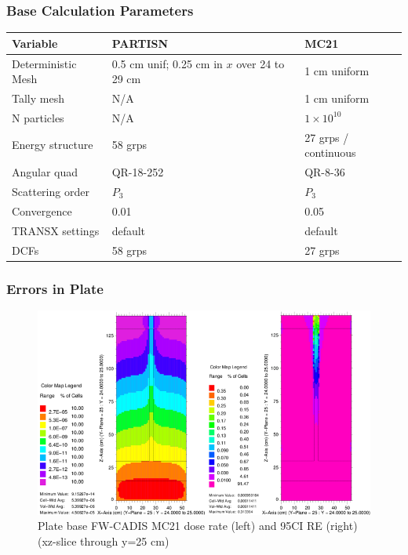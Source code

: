 \documentclass[xcolor=x11names,compress]{beamer}
\renewcommand{\(}{\begin{columns}}
\renewcommand{\)}{\end{columns}}
\newcommand{\<}[1]{\begin{column}{#1}}
\renewcommand{\>}{\end{column}}
\begin{document}
\begin{frame}[fragile]
  \frametitle{Base Calculation Parameters}
  \begin{table}[p]
  \label{tab:calcParams}
  \begin{center}
    \begin{tabu}{| X | X | X |}\hline
      Variable & PARTISN & MC21\\\hline\hline
	Deterministic Mesh & 0.5 cm unif; 0.25 cm in $x$ over 24 to 29 cm & 1 cm uniform \\\hline
	Tally mesh & N/A & 1 cm uniform \\\hline
	N particles & N/A & $1 \times 10^{10}$\\\hline
	Energy structure & 58 grps & 27 grps / continuous\\\hline
	Angular quad & QR-18-252 & QR-8-36\\\hline
	Scattering order & $P_3$ & $P_3$\\\hline
	Convergence & 0.01 & 0.05\\\hline
	TRANSX settings & default & default\\\hline
	DCFs & 58 grps & 27 grps \\\hline
    \end{tabu}
  \end{center}
\end{table}
  
\end{frame}

\begin{frame}[fragile]
  \frametitle{Errors in Plate}
 \begin{figure}[p]
   \begin{center}
     \includegraphics[height=2 in,clip]{NSE13-109R1-PlateDRandRE}
   \end{center}
   \caption{Plate base FW-CADIS MC21 dose rate (left) and 95CI RE (right) (xz-slice through y=25 cm)}
   \label{fig:Plate}
 \end{figure}
\end{frame}
\end{document}
